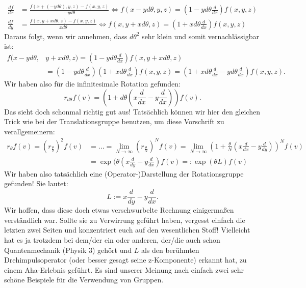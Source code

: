 \begin{Beispiel}
\begin{enumerate}
\begin{align*}
    \frac{df}{dx}&=\frac{f(x+(-yd\theta),y,z)-f(x,y,z)}{-yd\theta} \Leftrightarrow f(x-yd\theta,y,z)=(1-yd\theta\frac{d}{dx})f(x,y,z) \\
    \frac{df}{dy}&=\frac{f(x,y+xd\theta,z)-f(x,y,z)}{xd\theta} \Leftrightarrow f(x,y+xd\theta,z) = (1+xd\theta\frac{d}{dx})f(x,y,z)
\end{align*}
Daraus folgt, wenn wir annehmen, dass $d\theta^{2}$ sehr klein und somit vernachlässigbar ist:
\begin{align*}
    f(x-yd\theta,&y+xd\theta,z) = (1-yd\theta\frac{d}{dx})f(x,y+xd\theta,z)\\ &= (1-yd\theta\frac{d}{dx})(1+xd\theta\frac{d}{dx})f(x,y,z) = (1+xd\theta\frac{d}{dx}-yd\theta\frac{d}{dx})f(x,y,z).
\end{align*}
Wir haben also für die infinitesimale Rotation gefunden:
\begin{equation*}
    r_{d\theta}f(v)=(1+d\theta(x\frac{d}{dx}-y\frac{d}{dx}))f(v).
\end{equation*}
Das sieht doch schonmal richtig gut aus! Tatsächlich können wir hier den gleichen Trick wie bei der Translationsgruppe benutzen, um diese Vorschrift zu verallgemeinern:
\begin{align*}
    r_{\theta}f(v) = (r_{\frac{\theta}{2}})^{2}f(v)&=...=\lim_{N\rightarrow\infty}(r_{\frac{\theta}{N}})^{N}f(v)=\lim_{N\rightarrow\infty}(1+\frac{\theta}{N}(x\frac{d}{dx}-y\frac{d}{dy}))^{N}f(v)\\ &=\exp{(\theta(x\frac{d}{dy}-y\frac{d}{dx})}f(v) =: \exp{(\theta L)}f(v)
\end{align*}
Wir haben also tatsächlich eine (Operator-)Darstellung der Rotationsgruppe gefunden! Sie lautet:
\begin{equation*}
    L:=x\frac{d}{dy}-y\frac{d}{dx}.
\end{equation*}
Wir hoffen, dass diese doch etwas verschwurbelte Rechnung einigermaßen verständlich war. Sollte sie zu Verwirrung geführt haben, vergesst einfach die letzten zwei Seiten und konzentriert euch auf den wesentlichen Stoff! Vielleicht hat es ja trotzdem bei dem/der ein oder anderen, der/die auch schon Quantenmechanik (Physik 3) gehört und $L$ als den berühmten Drehimpulsoperator (oder besser gesagt seine z-Komponente) erkannt hat, zu einem Aha-Erlebnis geführt. Es sind unserer Meinung nach einfach zwei sehr schöne Beispiele für die Verwendung von Gruppen.

\end{enumerate}
\end{Beispiel}

